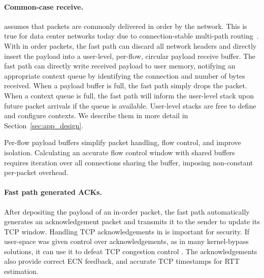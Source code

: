 \paragraph{Common-case receive.} \softtcp assumes that packets are
commonly delivered in order by the network. This is true for data
center networks today due to connection-stable multi-path
routing~\cite{vl2,jupiter}. With in order packets, the fast path can
discard all network headers and directly insert the payload into a
user-level, per-flow, circular payload receive buffer. The fast path
can directly write received payload to user memory, notifying an
appropriate context queue by identifying the connection and number of
bytes received. When a payload buffer is full, the fast path simply
drops the packet. When a context queue is full, the fast path will
inform the user-level stack upon future packet arrivals if the queue
is available. User-level stacks are free to define and configure
contexts. We describe them in more detail in
Section~\ref{sec:app_design}.

Per-flow payload buffers simplify packet handling, flow control, and
improve isolation.  Calculating an accurate flow control window with
shared buffers requires iteration over all connections sharing the
buffer, imposing non-constant per-packet overhead.

\paragraph{Fast path generated ACKs.} After depositing the payload of
an in-order packet, the fast path automatically generates an
acknowledgement packet and transmits it to the sender to update its
TCP window. Handling TCP acknowledgements in \taas is important for
security. If user-space was given control over acknowledgements, as in
many kernel-bypass solutions, it can use it to defeat TCP congestion
control \cite{misbehaving_receivers_ccr_1999}.  The acknowledgements
also provide correct ECN feedback, and accurate TCP timestamps for RTT
estimation.


